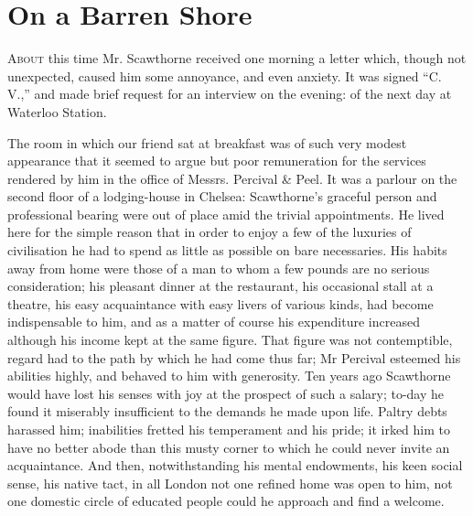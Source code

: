 \chapter{On a Barren Shore}

\textsc{About} this time Mr. Scawthorne received one morning a letter
which, though not unexpected, caused him some annoyance, and even
anxiety. It was signed ``C. V.,'' and made brief request for an
interview on the evening: of the next day at Waterloo Station.

The room in which our friend sat at breakfast was of such very modest
appearance that it seemed to argue but poor remuneration for the
services rendered by him in the office of Messrs. Percival \& Peel. It
was a parlour on the second floor of a lodging-house in Chelsea:
Scawthorne's graceful person and professional bearing were out of place
amid the trivial appointments. He lived here for the simple reason that
in order to enjoy a few of the luxuries of civilisation he had to spend
as little as possible on bare necessaries. His habits
{\protect\hypertarget{48}{}{}}away from home were those of a man to whom
a few pounds are no serious consideration; his pleasant dinner at the
restaurant, his occasional stall at a theatre, his easy acquaintance
with easy livers of various kinds, had become indispensable to him, and
as a matter of course his expenditure increased although his income kept
at the same figure. That figure was not contemptible, regard had to the
path by which he had come thus far; Mr Percival esteemed his abilities
highly, and behaved to him with generosity. Ten years ago Scawthorne
would have lost his senses with joy at the prospect of such a salary;
to-day he found it miserably insufficient to the demands he made upon
life. Paltry debts harassed him; inabilities fretted his temperament and
his pride; it irked him to have no better abode than this musty corner
to which he could never invite an acquaintance. And then,
notwithstanding his mental endowments, his keen social sense, his native
tact, in all London not one refined home was open to him, not one
domestic circle of educated people could he approach and find a welcome.

